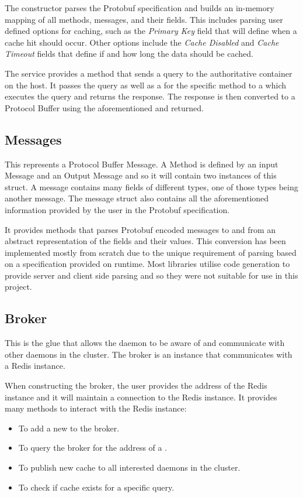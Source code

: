 \documentclass[12pt]{article}
\begin{document}
The constructor parses the Protobuf specification and builds an in-memory mapping of all methods, messages, and their fields.
This includes parsing user defined options for caching, such as the \textit{Primary Key} field that will define when a cache hit should occur.
Other options include the \textit{Cache Disabled} and \textit{Cache Timeout} fields that define if and how long the data should be cached.

The service provides a method that sends a query to the authoritative container on the host.
It passes the query as well as a \textit{} for the specific method to a \textit{} which executes the query
and returns the response. The response is then converted to a Protocol Buffer using the aforementioned \textit{} and returned.

\subsection{Messages}
\label{sec:messages}
This represents a Protocol Buffer Message. A Method is defined by an input Message and an Output Message and so it will contain two instances of this struct.
A message contains many fields of different types, one of those types being another message. The message struct also contains all the
aforementioned information provided by the user in the Protobuf specification.

It provides methods that parses Protobuf encoded messages to and from an abstract representation of the fields and their values. This conversion has been
implemented mostly from scratch due to the unique requirement of parsing based on a specification provided on runtime. Most libraries utilise code generation
to provide server and client side parsing and so they were not suitable for use in this project.

\subsection{Broker}
\label{sec:broker}

This is the glue that allows the daemon to be aware of and communicate with other daemons in the cluster.
The broker is an instance that communicates with a Redis \cite{redis} instance.

When constructing the broker, the user provides the address of the Redis instance and it will maintain a connection to the Redis instance.
It provides many methods to interact with the Redis instance:
\begin{itemize}
    \item To add a new \textit{} to the broker.
    \item To query the broker for the address of a \textit{}.
    \item To publish new cache to all interested daemons in the cluster.
    \item To check if cache exists for a specific query.
\end{itemize}
\end{document}
